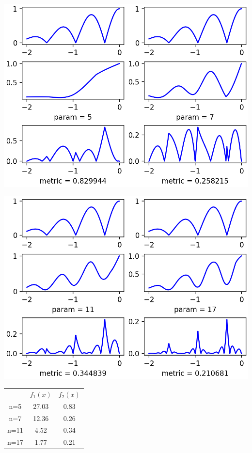 \documentclass{article}
\begin{document}
\begin{Center}
\includegraphics{F2_p5p7_Splain.png}

\includegraphics{F2_p11p17_Splain.png}
\end{Center}

\begin{center}
	
	
	\begin{tabular}{ c   c   c}
		 & \(f_1(x)\) & \(f_2(x)\) \\
		n=5 & 27.03 & 0.83 \\ 
		n=7 & 12.36 & 0.26 \\  
		n=11 & 4.52 & 0.34 \\
		n=17 &  1.77 & 0.21
	\end{tabular}
	
\end{center}
\end{document}
